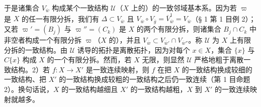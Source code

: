 于是诸集合 \(V_{\overline{w}}\) 构成某个一致结构 \(\mathcal{U}\)（\(X\) 上的）的一致邻域基本系。因为若 \(\varpi\) 是 \(X\) 的任一有限分拆，我们有 \(\Delta \subset V_{\overline{w}}\) 且 \(V_{\overline{w}} \circ V_{\overline{g}} = \overline{V}_{\overline{w}}^{1} = V_{\overline{w}}\)（§ 1 第 1 目例 2）；又若 \(\varpi' = (B_j)\) 与 \(\varpi'' = (C_k)\) 是 \(X\) 的两个有限分拆，则诸集合 \(B_j \cap C_k\) 中非空者构成一个有限分拆 \(\varpi\)（\(X\) 的），并且 \(V_{\overline{w}} \subset V_{\overline{w}'} \cap V_{\overline{w}''}\)。称 \(\mathcal{U}\) 为 \(X\) 上有限分拆的一致结构。由 \(\mathcal{U}\) 诱导的拓扑是离散拓扑，因为对每个 \(x \in X\)，集合 \(\{x\}\) 与 \(C\{x\}\) 构成 \(X\) 的一个有限分拆。然而，若 \(X\) 无限，则显然 \(\mathcal{U}\) 严格地粗于离散一致结构。2）若 \(f: X \to X'\) 是一致连续映射，则 \(f\) 在把 \(X\) 的一致结构换成较细的一致结构、把 \(X'\) 的一致结构换成较粗的一致结构之后仍一致连续（第 1 目命题 2）。换句话说，\(X\) 的一致结构越细且 \(X'\) 的一致结构越粗，\(X\) 到 \(X'\) 的一致连续映射就越多。

